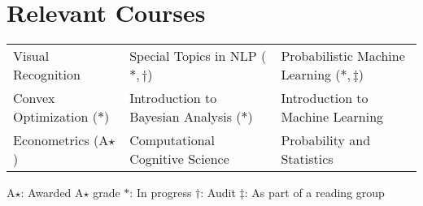 \setlength\extrarowheight{3pt}  %

\section*{Relevant Courses}
\begin{tabularx}{\textwidth}{L L L}
    Visual Recognition &
    Special Topics in NLP ($\ast, \dagger$) &
    Probabilistic Machine Learning ($\ast, \ddagger$)\\
    Convex Optimization ($\ast$) &
    Introduction to Bayesian Analysis ($\ast$) &
    Introduction to Machine Learning \\
    Econometrics (A$\star$)&
    Computational Cognitive Science &
    Probability and Statistics
\end{tabularx}

\vspace{2mm}
{\small A$\star$: Awarded A$\star$ grade \hspace{5mm} $\ast$: In progress \hspace{5mm} $\dagger$: Audit \hspace{5mm} $\ddagger$: As part of a reading group}
